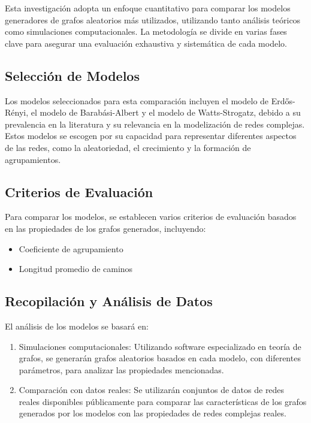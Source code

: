 \documentclass[12pt]{book}
\begin{document}
Esta investigación adopta un enfoque cuantitativo para comparar los modelos generadores de grafos aleatorios más utilizados, utilizando tanto análisis teóricos como simulaciones computacionales. La metodología se divide en varias fases clave para asegurar una evaluación exhaustiva y sistemática de cada modelo.

\subsection{Selección de Modelos}

Los modelos seleccionados para esta comparación incluyen el modelo de Erdős-Rényi, el modelo de Barabási-Albert y el modelo de Watts-Strogatz, debido a su prevalencia en la literatura y su relevancia en la modelización de redes complejas. Estos modelos se escogen por su capacidad para representar diferentes aspectos de las redes, como la aleatoriedad, el crecimiento y la formación de agrupamientos.

\subsection{Criterios de Evaluación}

Para comparar los modelos, se establecen varios criterios de evaluación basados en las propiedades de los grafos generados, incluyendo:
\begin{itemize}
    \item Coeficiente de agrupamiento
    \item Longitud promedio de caminos
\end{itemize}

\subsection{Recopilación y Análisis de Datos}

El análisis de los modelos se basará en:
\begin{enumerate}
    \item Simulaciones computacionales: Utilizando software especializado en teoría de grafos, se generarán grafos aleatorios basados en cada modelo, con diferentes parámetros, para analizar las propiedades mencionadas.
    \item Comparación con datos reales: Se utilizarán conjuntos de datos de redes reales disponibles públicamente para comparar las características de los grafos generados por los modelos con las propiedades de redes complejas reales.
\end{enumerate}
\end{document}
